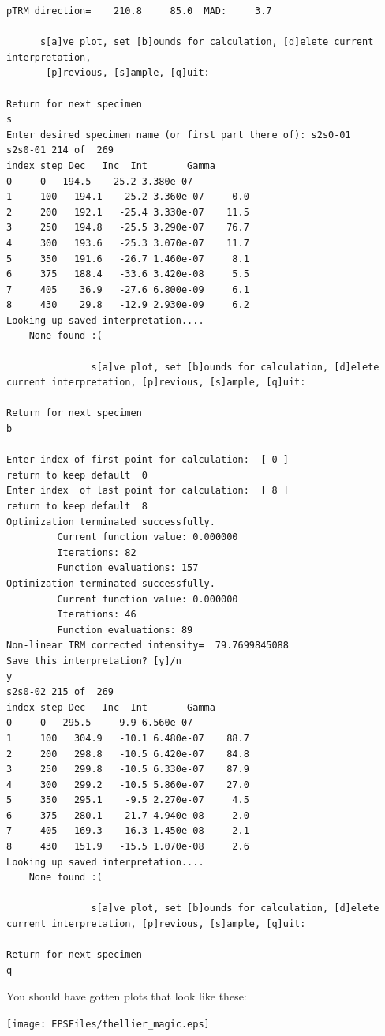 \documentclass[11pt]{book}
\begin{document}
{{{\begin{verbatim}
pTRM direction=    210.8     85.0  MAD:     3.7

      s[a]ve plot, set [b]ounds for calculation, [d]elete current interpretation,
       [p]revious, [s]ample, [q]uit:

Return for next specimen
s
Enter desired specimen name (or first part there of): s2s0-01
s2s0-01 214 of  269
index step Dec   Inc  Int       Gamma
0     0   194.5   -25.2 3.380e-07
1     100   194.1   -25.2 3.360e-07     0.0
2     200   192.1   -25.4 3.330e-07    11.5
3     250   194.8   -25.5 3.290e-07    76.7
4     300   193.6   -25.3 3.070e-07    11.7
5     350   191.6   -26.7 1.460e-07     8.1
6     375   188.4   -33.6 3.420e-08     5.5
7     405    36.9   -27.6 6.800e-09     6.1
8     430    29.8   -12.9 2.930e-09     6.2
Looking up saved interpretation....
    None found :(

               s[a]ve plot, set [b]ounds for calculation, [d]elete current interpretation, [p]revious, [s]ample, [q]uit:

Return for next specimen
b

Enter index of first point for calculation:  [ 0 ]
return to keep default  0
Enter index  of last point for calculation:  [ 8 ]
return to keep default  8
Optimization terminated successfully.
         Current function value: 0.000000
         Iterations: 82
         Function evaluations: 157
Optimization terminated successfully.
         Current function value: 0.000000
         Iterations: 46
         Function evaluations: 89
Non-linear TRM corrected intensity=  79.7699845088
Save this interpretation? [y]/n
y
s2s0-02 215 of  269
index step Dec   Inc  Int       Gamma
0     0   295.5    -9.9 6.560e-07
1     100   304.9   -10.1 6.480e-07    88.7
2     200   298.8   -10.5 6.420e-07    84.8
3     250   299.8   -10.5 6.330e-07    87.9
4     300   299.2   -10.5 5.860e-07    27.0
5     350   295.1    -9.5 2.270e-07     4.5
6     375   280.1   -21.7 4.940e-08     2.0
7     405   169.3   -16.3 1.450e-08     2.1
8     430   151.9   -15.5 1.070e-08     2.6
Looking up saved interpretation....
    None found :(

               s[a]ve plot, set [b]ounds for calculation, [d]elete current interpretation, [p]revious, [s]ample, [q]uit:

Return for next specimen
q
\end{verbatim}

You should have gotten plots that look like these:

\texttt{[image: EPSFiles/thellier\_magic.eps]}



}}}
\end{document}
